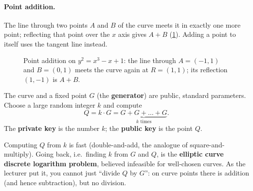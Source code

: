 \paragraph{Point addition.} The line through two points $A$ and $B$ of the curve meets it in exactly one more point; reflecting that point over the $x$ axis gives $A + B$ (\cref{fig:ecc-add}). Adding a point to itself uses the tangent line instead.

\begin{figure}[H]
\centering
{}
\caption{Point addition on $y^2 = x^3 - x + 1$: the line through $A=(-1,1)$ and $B=(0,1)$ meets the curve again at $R=(1,1)$; its reflection $(1,-1)$ is $A+B$.}
\label{fig:ecc-add}
\end{figure}

\begin{definition}
The curve and a fixed point $G$ (the \textbf{generator}) are public, standard parameters. Choose a large random integer $k$ and compute
\[
Q = k \cdot G = \underbrace{G + G + \dots + G}_{k \text{ times}}.
\]
The \textbf{private key} is the number $k$; the \textbf{public key} is the point $Q$.
\end{definition}

Computing $Q$ from $k$ is fast (double-and-add, the analogue of square-and-multiply). Going back, i.e.\ finding $k$ from $G$ and $Q$, is the \textbf{elliptic curve discrete logarithm problem}, believed infeasible for well-chosen curves. As the lecturer put it, you cannot just \enquote{divide $Q$ by $G$}: on curve points there is addition (and hence subtraction), but no division.

